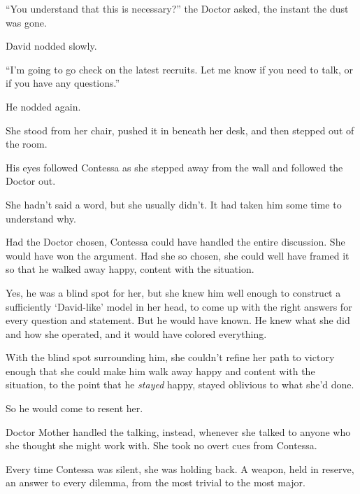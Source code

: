 ``You understand that this is necessary?''  the Doctor asked, the instant the dust was gone.



David nodded slowly.



``I'm going to go check on the latest recruits.  Let me know if you need to talk, or if you have any questions.''



He nodded again.



She stood from her chair, pushed it in beneath her desk, and then stepped out of the room.



His eyes followed Contessa as she stepped away from the wall and followed the Doctor out.



She hadn't said a word, but she usually didn't.  It had taken him some time to understand why.



Had the Doctor chosen, Contessa could have handled the entire discussion.  She would have won the argument.  Had she so chosen, she could well have framed it so that he walked away happy, content with the situation.



Yes, he was a blind spot for her, but she knew him well enough to construct a sufficiently `David-like' model in her head, to come up with the right answers for every question and statement.  But he would have known.  He knew what she did and how she operated, and it would have colored everything.



With the blind spot surrounding him, she couldn't refine her path to victory enough that she could make him walk away happy and content with the situation, to the point that he \emph{stayed }happy, stayed oblivious to what she'd done.



So he would come to resent her.



Doctor Mother handled the talking, instead, whenever she talked to anyone who she thought she might work with.  She took no overt cues from Contessa.



Every time Contessa was silent, she was holding back.  A weapon, held in reserve, an answer to every dilemma, from the most trivial to the most major.



